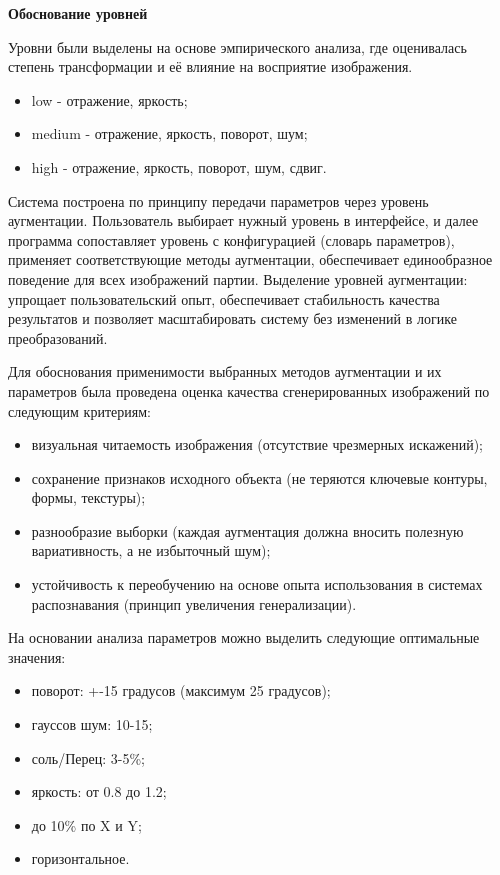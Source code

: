 \textbf{Обоснование уровней}

Уровни были выделены на основе эмпирического анализа, где оценивалась степень трансформации и её влияние на восприятие изображения. %
\begin{itemize}
	\item low - отражение, яркость;
	\item medium - отражение, яркость, поворот, шум;
	\item high - отражение, яркость, поворот, шум, сдвиг.
\end{itemize}
	

Система построена по принципу передачи параметров через уровень аугментации. Пользователь выбирает нужный уровень в интерфейсе, и далее программа сопоставляет уровень с конфигурацией (словарь параметров), применяет соответствующие методы аугментации, обеспечивает единообразное поведение для всех изображений партии. Выделение уровней аугментации: упрощает пользовательский опыт, обеспечивает стабильность качества результатов и позволяет масштабировать систему без изменений в логике преобразований.

Для обоснования применимости выбранных методов аугментации и их параметров была проведена оценка качества сгенерированных изображений по следующим критериям:
\begin{itemize}
	\item визуальная читаемость изображения (отсутствие чрезмерных искажений);
	\item сохранение признаков исходного объекта (не теряются ключевые контуры, формы, текстуры);
	\item разнообразие выборки (каждая аугментация должна вносить полезную вариативность, а не избыточный шум);
	\item устойчивость к переобучению на основе опыта использования в системах распознавания (принцип увеличения генерализации).
\end{itemize}

На основании анализа параметров можно выделить следующие оптимальные значения:

\begin{itemize}
	\item поворот: +-15 градусов (максимум 25 градусов);
	\item гауссов шум: 10-15;
	\item соль/Перец: 3-5\%;
	\item яркость: от 0.8 до 1.2;
	\item до 10\% по X и Y;
	\item горизонтальное.
\end{itemize}

